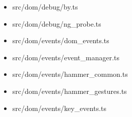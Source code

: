 














\begin{itemize}
  \item src/dom/debug/by.ts
  \item src/dom/debug/ng\_probe.ts
\end{itemize}





\begin{itemize}
  \item src/dom/events/dom\_events.ts
  \item src/dom/events/event\_manager.ts
  \item src/dom/events/hammer\_common.ts
  \item src/dom/events/hammer\_gestures.ts
  \item src/dom/events/key\_events.ts
\end{itemize}

